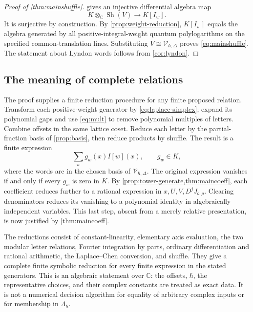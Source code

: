 \documentclass[11pt]{article}
\numberwithin{equation}{section}
\theoremstyle{definition}
\theoremstyle{remark}
\newcommand{\C}{\mathbb C}
\newcommand{\Sh}{\operatorname{Sh}}
\newcommand{\calV}{\mathcal V}
\newcommand{\qh}{\hbar}
\begin{document}
\begin{proof}[Proof of \cref{thm:mainshuffle}]
 gives an injective differential algebra map
\[
 K\otimes_\C\Sh(V)\longrightarrow K[I_w].
\]
It is surjective by construction. By \cref{prop:weight-reduction},
$K[I_w]$ equals the algebra generated by all positive-integral-weight quantum
polylogarithms on the specified common-translation lines. Substituting
$V\cong\calV_{\qh,\Delta}$ proves \eqref{eq:mainshuffle}.
The statement about Lyndon words follows from \cref{cor:lyndon}.
\end{proof}

\subsection{The meaning of complete relations}

The proof supplies a finite reduction procedure for any finite proposed
relation. Transform each positive-weight generator by
\eqref{eq:laplace-simplex}; expand its polynomial gaps and use
\eqref{eq:mult} to remove polynomial multiples of letters. Combine offsets
in the same lattice coset. Reduce each letter by the partial-fraction basis
of \cref{prop:basis}, then reduce products by shuffle. The result is a
finite expression
\begin{equation}\label{eq:normalform}
 \sum_w g_w(x)I[w](x),\qquad g_w\in K,
\end{equation}
where the words are in the chosen basis of $\calV_{\qh,\Delta}$.
The original expression vanishes if and only if every $g_w$ is zero in $K$.
By \cref{prop:tower-generate,thm:maincoeff}, each coefficient reduces further
to a rational expression in $x,U,V,D^jJ_{b,\rho}$. Clearing denominators
reduces its vanishing to a polynomial identity in algebraically independent
variables. This last step, absent from a merely relative presentation, is now
justified by \cref{thm:maincoeff}.

The reductions consist of constant-linearity, elementary axis evaluation,
the two modular letter relations, Fourier integration by parts, ordinary
differentiation and rational arithmetic, the Laplace--Chen conversion, and
shuffle. They give a complete finite symbolic reduction for every finite
expression in the stated generators. This is an algebraic statement over
$\C$: the offsets, $\qh$, the representative choices, and their complex
constants are treated as exact data. It is not a numerical decision algorithm
for equality of arbitrary complex inputs or for membership in
$\Lambda_\qh$.
\end{document}
